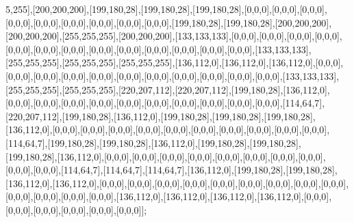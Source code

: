 5,255],[200,200,200],[199,180,28],[199,180,28],[199,180,28],[0,0,0],[0,0,0],[0,0,0],[0,0,0],[0,0,0],[0,0,0],[0,0,0],[0,0,0],[0,0,0],[199,180,28],[199,180,28],[200,200,200],[200,200,200],[255,255,255],[200,200,200],[133,133,133],[0,0,0],[0,0,0],[0,0,0],[0,0,0],[0,0,0],[0,0,0],[0,0,0],[0,0,0],[0,0,0],[0,0,0],[0,0,0],[0,0,0],[0,0,0],[133,133,133],[255,255,255],[255,255,255],[255,255,255],[136,112,0],[136,112,0],[136,112,0],[0,0,0],[0,0,0],[0,0,0],[0,0,0],[0,0,0],[0,0,0],[0,0,0],[0,0,0],[0,0,0],[0,0,0],[0,0,0],[133,133,133],[255,255,255],[255,255,255],[220,207,112],[220,207,112],[199,180,28],[136,112,0],[0,0,0],[0,0,0],[0,0,0],[0,0,0],[0,0,0],[0,0,0],[0,0,0],[0,0,0],[0,0,0],[0,0,0],[114,64,7],[220,207,112],[199,180,28],[136,112,0],[199,180,28],[199,180,28],[199,180,28],[136,112,0],[0,0,0],[0,0,0],[0,0,0],[0,0,0],[0,0,0],[0,0,0],[0,0,0],[0,0,0],[0,0,0],[0,0,0],[114,64,7],[199,180,28],[199,180,28],[136,112,0],[199,180,28],[199,180,28],[199,180,28],[136,112,0],[0,0,0],[0,0,0],[0,0,0],[0,0,0],[0,0,0],[0,0,0],[0,0,0],[0,0,0],[0,0,0],[0,0,0],[114,64,7],[114,64,7],[114,64,7],[136,112,0],[199,180,28],[199,180,28],[136,112,0],[136,112,0],[0,0,0],[0,0,0],[0,0,0],[0,0,0],[0,0,0],[0,0,0],[0,0,0],[0,0,0],[0,0,0],[0,0,0],[0,0,0],[0,0,0],[0,0,0],[136,112,0],[136,112,0],[136,112,0],[136,112,0],[0,0,0],[0,0,0],[0,0,0],[0,0,0],[0,0,0],[0,0,0]];

